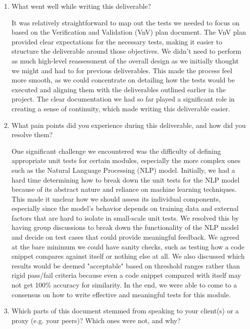 \documentclass[12pt, titlepage]{article}
\begin{document}
\begin{enumerate}
  \item What went well while writing this deliverable?
  
  It was relatively straightforward to map out the tests we needed to focus on 
  based on the Verification and Validation (VnV) plan document. The VnV plan 
  provided clear expectations for the necessary tests, making it easier to 
  structure the deliverable around those objectives. We didn't need to perform 
  as much high-level reassessment of the overall design as we initially thought 
  we might and had to for previous deliverables. This made the process feel 
  more smooth, as we could concentrate on detailing how the tests would be 
  executed and aligning them with the deliverables outlined earlier in the 
  project. The clear documentation we had so far played a significant role in 
  creating a sense of continuity, which made writing this deliverable easier.

  \item What pain points did you experience during this deliverable, and how
    did you resolve them?

    One significant challenge we encountered was the difficulty of defining 
    appropriate unit tests for certain modules, especially the more complex 
    ones such as the Natural Language Processing (NLP) model. Initially, we 
    had a hard time determining how to break down the unit tests for the NLP 
    model because of its abstract nature and reliance on machine learning 
    techniques. This made it unclear how we should assess its individual 
    components, especially since the model's behavior depends on training 
    data and external factors that are hard to isolate in small-scale unit tests. 
    We resolved this by having group discussions to break down the 
    functionality of the NLP model and decide on test cases that could provide 
    meaningful feedback. We agreed at the bare minimum we could have sanity checks, 
    such as testing how a code snippet compares against itself or nothing else at all. 
    We also discussed which results would be deemed "acceptable" based on  
    threshold ranges rather than rigid pass/fail criteria because even a code snippet 
    compared with itself may not get 100\% accuracy for similarity. In the end, 
    we were able to come to a consensus on how to write effective and meaningful tests 
    for this module.

  \item Which parts of this document stemmed from speaking to your client(s) or
  a proxy (e.g. your peers)? Which ones were not, and why?


\end{enumerate}
\end{document}
